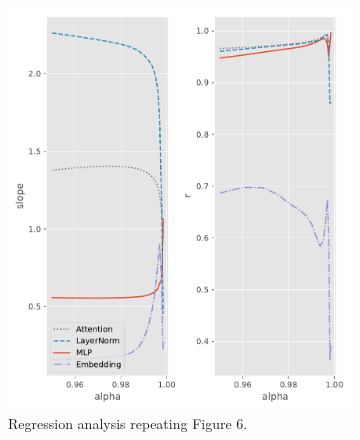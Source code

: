 \documentclass{article}
\begin{document}
\begin{figure}
    \centering
    \begin{subfigure}[b]{0.49\textwidth}
        \centering
        \includegraphics[width=\linewidth]{neurips2024rebuttals/regress_gns.pdf}
        \caption{Regression analysis repeating Figure 6.}
        \label{fig:1p3b_left_subplot}
    \end{subfigure}
    \begin{subfigure}[b]{0.49\textwidth}
        \centering

\end{subfigure}
\end{figure}
\end{document}
